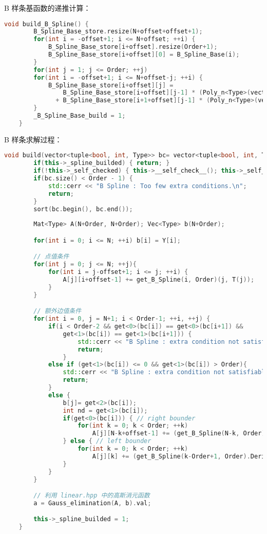 \documentclass[lang=cn,a4paper,newtx,bibend=bibtex]{elegantpaper}
\begin{document}
B 样条基函数的递推计算：

\begin{lstlisting}[language=C++]
    void build_B_Spline() {
		B_Spline_Base_store.resize(N+offset+offset+1);
		for(int i = -offset+1; i <= N+offset; ++i) {
			B_Spline_Base_store[i+offset].resize(Order+1);
			B_Spline_Base_store[i+offset][0] = B_Spline_Base(i);
		}
		for(int j = 1; j <= Order; ++j) 
		for(int i = -offset+1; i <= N+offset-j; ++i) {
			B_Spline_Base_store[i+offset][j] = 
				B_Spline_Base_store[i+offset][j-1] * (Poly_n<Type>(vector<Type>{-T(i-1), 1}) / (T(i+j-1)-T(i-1)))
			  + B_Spline_Base_store[i+1+offset][j-1] * (Poly_n<Type>(vector<Type>{T(i+j), -1}) / (T(i+j)-T(i)));
		}
		_B_Spline_Base_build = 1;
	}
\end{lstlisting}

B 样条求解过程：

\begin{lstlisting}[language=C++]
    void build(vector<tuple<bool, int, Type>> bc= vector<tuple<bool, int, Type>>(0)) {
        if(this->_spline_builded) { return; }
        if(!this->_self_checked) { this->__self_check__(); this->_self_checked = 1; }
		if(bc.size() < Order - 1) {
			std::cerr << "B Spline : Too few extra conditions.\n";
			return;
		}
		sort(bc.begin(), bc.end());
		
		Mat<Type> A(N+Order, N+Order); Vec<Type> b(N+Order);

		for(int i = 0; i <= N; ++i) b[i] = Y[i];

        // 点值条件
		for(int j = 0; j <= N; ++j){
			for(int i = j-offset+1; i <= j; ++i) {
				A[j][i+offset-1] += get_B_Spline(i, Order)(j, T(j));
			}
		}

        // 额外边值条件
		for(int i = 0, j = N+1; i < Order-1; ++i, ++j) {
			if(i < Order-2 && get<0>(bc[i]) == get<0>(bc[i+1]) && 
				get<1>(bc[i]) == get<1>(bc[i+1])) {
					std::cerr << "B Spline : extra condition not satisfiable.\n";
					return;
				}
			else if (get<1>(bc[i]) <= 0 && get<1>(bc[i]) > Order){
				std::cerr << "B Spline : extra condition not satisfiable.\n";
				return;
			}
			else {
				b[j]= get<2>(bc[i]);
				int nd = get<1>(bc[i]);
				if(get<0>(bc[i])) { // right bounder
					for(int k = 0; k < Order; ++k)
						A[j][N-k+offset-1] += (get_B_Spline(N-k, Order).Derivative(nd))(N, T(N));
				} else { // left bounder
					for(int k = 0; k < Order; ++k)
						A[j][k] += (get_B_Spline(k-Order+1, Order).Derivative(nd))(0, T(0));
				}
			}
		}

        // 利用 linear.hpp 中的高斯消元函数
		a = Gauss_elimination(A, b).val;

        this->_spline_builded = 1;
    }
\end{lstlisting}
\end{document}
